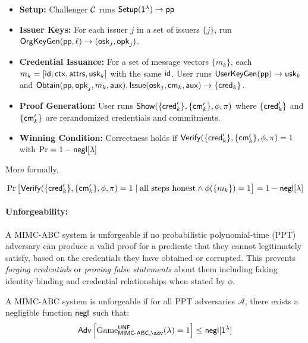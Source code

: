     \begin{itemize}
        \item \textbf{Setup:} Challenger $\mathcal{C}$ runs $\mathsf{Setup}(\mathsf{1^{\lambda}}) \to \mathsf{pp}$
        \item \textbf{Issuer Keys:} For each issuer $j$ in a set of issuers $\{j\}$, run $\mathsf{OrgKeyGen}(\mathsf{pp}, \ell) \to (\mathsf{osk}_j, \mathsf{opk}_j)$.
        \item \textbf{Credential Issuance: } For a set of message vectors $\{m_k\}$, each $m_k = [\mathsf{id}, \mathsf{ctx}, \mathsf{attrs}, \mathsf{usk}_k]$ with the same $\mathsf{id}$. User runs $\mathsf{UserKeyGen}(\mathsf{pp}) \to \mathsf{usk}_k$ and $\mathsf{Obtain}(\mathsf{pp}, \mathsf{opk}_j, m_k, \mathsf{aux}),\mathsf{Issue}(\mathsf{osk}_j, \mathsf{cm}_k, \mathsf{aux}) \to \{\mathsf{cred}_k\}$. 
        \item \textbf{Proof Generation:} User runs $\mathsf{Show}(\{\mathsf{cred}_k'\}, \{\mathsf{cm}_k'\}, \phi, \pi)$ where $\{\mathsf{cred}_k'\}$ and $\{\mathsf{cm}_k'\}$ are rerandomized credentials and commitments.
        \item \textbf{Winning Condition:} Correctness holds if $\mathsf{Verify}(\{\mathsf{cred}_k'\}, \{\mathsf{cm}_k'\}, \phi, \pi) = 1 $ with $\Pr = 1-\mathsf{negl}[\lambda]$
    \end{itemize}
More formally,
\begin{definition}[Correctness]
    \[
        \Pr \left[ 
            \mathsf{Verify}(\{\mathsf{cred}_k'\}, \{\mathsf{cm}_k'\}, \phi, \pi) = 1 \mid \text{all steps honest} \wedge \phi(\{m_k\}) = 1
        \right] = 1 - \mathsf{negl}[\lambda]
    \]
\end{definition}















\paragraph{Unforgeability:} A MIMC-ABC system is unforgeable if no probabilistic polynomial-time (PPT) adversary can produce a valid proof for a predicate that they cannot legitimately satisfy, based on the credentials they have obtained or corrupted. This prevents \emph{forging credentials} or \emph{proving false statements} about them including faking identity binding and credential relationships when stated by $\phi$.


\begin{definition}[Unforgeability]
A MIMC-ABC system is unforgeable if for all PPT adversaries $\mathcal{A}$, there exists a negligible function $\mathsf{negl}$ such that:
\[
\mathsf{Adv}\left[\mathrm{Game}^{\mathsf{\UNF}}_{\MIMCABC, \adv}(\lambda) = 1\right] \leq \negl[\secparam]
\]
\end{definition}

